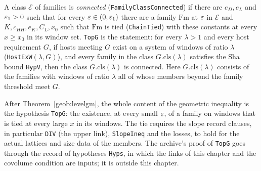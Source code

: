 \begin{definition}\label{geob:topg}
A class $\mathcal E$ of families is \emph{connected}
(\texttt{FamilyClassConnected}) if there are $e_D,e_L$ and $\varepsilon_1>0$ such that
for every $\varepsilon\in(0,\varepsilon_1)$ there are a family $\mathrm{Fm}$ at $\varepsilon$ in
$\mathcal E$ and $K,c_{HH},e_K,C_L,x_0$ such that $\mathrm{Fm}$ is tied
(\texttt{ChainTied}) with these constants at every $x\ge x_0$ in its window set.
\texttt{TopG} is the statement: for every $\lambda>1$ and every host requirement
$G$, if hosts meeting $G$ exist on a system of windows of ratio $\lambda$
(\texttt{HostExW}$(\lambda,G)$), and every family in the class
$G.\mathrm{cls}(\lambda)$ satisfies the Sha bound \texttt{HypV}, then the class
$G.\mathrm{cls}(\lambda)$ is connected. Here $G.\mathrm{cls}(\lambda)$ consists
of the families with windows of ratio $\lambda$ all of whose members beyond the
family threshold meet $G$.
\end{definition}



\begin{remark}
After Theorem~\ref{geob:levelgm}, the whole content of the geometric
inequality is the hypothesis \texttt{TopG}: the existence, at every small
$\varepsilon$, of a family on windows that is tied at every large $x$ in its windows.
The tie requires the slope record clauses, in particular \texttt{DIV}
(the upper link), \texttt{SlopeIneq} and the losses, to hold for the actual
lattices and size data of the members. The archive's proof of \texttt{TopG}
goes through the record of hypotheses \texttt{Hyps}, in which the links of this
chapter and the covolume condition are inputs; it is outside this chapter.
\end{remark}
